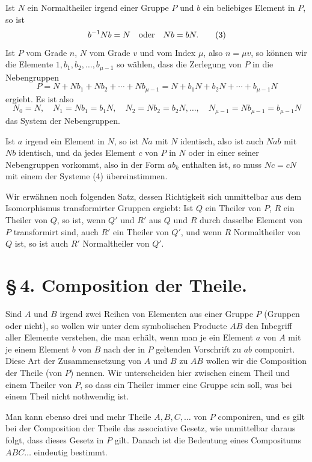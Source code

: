 \documentclass[11pt]{article}
\begin{document}
Ist $N$ ein Normaltheiler irgend einer Gruppe $P$ und $b$ ein beliebiges Element in $P$, so ist
\begin{equation}
b^{-1}Nb=N\quad\hbox{oder}\quad Nb=bN.
\tag{3}
\end{equation}
Ist $P$ vom Grade $n$, $N$ vom Grade $v$ und vom Index $\mu$, also $n=\mu v$, so können wir die Elemente $1,b_1,b_2,\ldots,b_{\mu-1}$ so wählen, dass die Zerlegung von $P$ in die Nebengruppen
\[
P=N+Nb_1+Nb_2+\cdots+Nb_{\mu-1}=N+b_1N+b_2N+\cdots+b_{\mu-1}N
\]
ergiebt. Es ist also
\begin{equation}
N_0=N,
\quad N_1=Nb_1=b_1N,
\quad N_2=Nb_2=b_2N,
\ldots,
\quad N_{\mu-1}=Nb_{\mu-1}=b_{\mu-1}N
\tag{4}
\end{equation}
das System der Nebengruppen.

Ist $a$ irgend ein Element in $N$, so ist $Na$ mit $N$ identisch, also ist auch $Nab$ mit $Nb$ identisch, und da jedes Element $c$ von $P$ in $N$ oder in einer seiner Nebengruppen vorkommt, also in der Form $ab_k$ enthalten ist, so muss $Nc=cN$ mit einem der Systeme (4) übereinstimmen.

Wir erwähnen noch folgenden Satz, dessen Richtigkeit sich unmittelbar aus dem Isomorphismus transformirter Gruppen ergiebt: Ist $Q$ ein Theiler von $P$, $R$ ein Theiler von $Q$, so ist, wenn $Q'$ und $R'$ aus $Q$ und $R$ durch dasselbe Element von $P$ transformirt sind, auch $R'$ ein Theiler von $Q'$, und wenn $R$ Normaltheiler von $Q$ ist, so ist auch $R'$ Normaltheiler von $Q'$.

\section*{\S\,4. Composition der Theile.}

Sind $A$ und $B$ irgend zwei Reihen von Elementen aus einer Gruppe $P$ (Gruppen oder nicht), so wollen wir unter dem symbolischen Producte $AB$ den Inbegriff aller Elemente verstehen, die man erhält, wenn man je ein Element $a$ von $A$ mit je einem Element $b$ von $B$ nach der in $P$ geltenden Vorschrift zu $ab$ componirt. Diese Art der Zusammensetzung von $A$ und $B$ zu $AB$ wollen wir die Composition der Theile (von $P$) nennen. Wir unterscheiden hier zwischen einem Theil und einem Theiler von $P$, so dass ein Theiler immer eine Gruppe sein soll, was bei einem Theil nicht nothwendig ist.

Man kann ebenso drei und mehr Theile $A,B,C,\ldots$ von $P$ componiren, und es gilt bei der Composition der Theile das associative Gesetz, wie unmittelbar daraus folgt, dass dieses Gesetz in $P$ gilt. Danach ist die Bedeutung eines Compositums $ABC\ldots$ eindeutig bestimmt.
\end{document}
